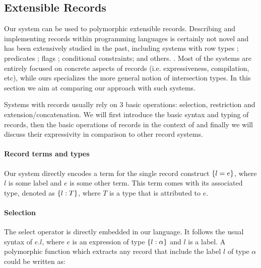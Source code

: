 \subsection{Extensible Records}
Our system can be used to polymorphic extensible records. Describing and
implementing records within programming languages is certainly not
novel and has been extensively studied in the past, including
systems with row types \cite{wand1987complete,wand1989type}; 
predicates \cite{harper1990extensible,harper1991record}; 
flags \cite{remy1993type}; conditional constraints; and others.
. 
Most of the systems are entirely focused on concrete aspects of records
(i.e. expressiveness, compilation, etc), while ours specializes
the more general notion of intersection types.  In this section we aim
at comparing our approach with such systems.

Systems with records usually rely on 3 basic operations: selection,
restriction and extension/concatenation.  We will first introduce the
basic syntax and typing of records, then the basic operations of
records in the context of \name and finally we will discuss their
expressivity in comparison to other record systems.

\paragraph{Record terms and types}
Our system directly encodes a term for the single record construct $\{ l = e \}$, where $l$ is some
label and $e$ is some other term.
This term comes with its associated type, denoted as $\{ l : T \}$, where $T$ is a type that is attributed 
to $e$. 

\paragraph{Selection}
The select operator is directly embedded in our language. 
It follows the usual syntax of $e.l$, where $e$ is an expression of type $\{ l : \alpha \}$ and 
$l$ is a label.
A polymorphic function which extracts any record that include the label $l$ of type
$\alpha$ could be written as:

